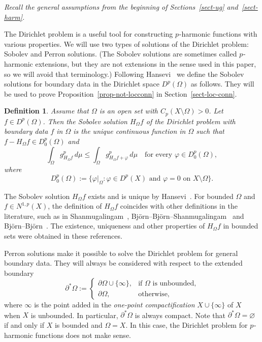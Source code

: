 \documentclass[a4paper,twoside]{article}
\theoremstyle{propositional}
\theoremstyle{descriptive}
\newtheorem{deff}[thm]{Definition}
\theoremstyle{remarkstyle}
\newcommand{\setm}{\setminus}
\renewcommand{\emptyset}{\varnothing}
\newcommand{\Cp}{{C_p}}
\newcommand{\bdry}{\partial}
\newcommand{\bdy}{\bdry}
\newcommand{\Om}{\Omega}
\renewcommand{\phi}{\varphi}
\newcommand{\p}{{$p\mspace{1mu}$}}
\newcommand{\Np}{N^{1,p}}
\newcommand{\Dp}{D^{p}}
\newcommand{\bdystar}{\partial^*}
\newcommand{\binfty}{{\boldsymbol{\infty}}}
\numberwithin{equation}{section}
\begin{document}
\emph{Recall the general assumptions from the beginning of Sections~\ref{sect-ug}
and~\ref{sect-harm}.}

\medskip


The Dirichlet problem is  
a useful tool for constructing \p-harmonic functions
with various properties.
We will use two types of solutions of 
the Dirichlet problem:
Sobolev and Perron solutions.
(The Sobolev solutions are 
sometimes called \p-harmonic extensions,
but they are not extensions in the sense used in this paper,
so we will avoid that terminology.) 
Following Hansevi~\cite[Definition~4.6]{Hansevi1}
we define the Sobolev solutions for boundary data in the
Dirichlet space $\Dp(\Om)$  as follows.
They will be used  to prove Proposition~\ref{prop-not-locconn}
in Section~\ref{sect-loc-conn}. 


\begin{deff}  \label{def-harm-ext}
Assume that $\Om$ is an open set with $\Cp(X \setm \Om)>0$.
Let $f \in \Dp(\Om)$.
Then the \emph{Sobolev solution}
$H_\Om f$ of the Dirichlet problem with boundary data
$f$ in $\Om$ is the unique continuous function
in $\Om$ such that $f-H_\Om f \in \Dp_0(\Om)$ and
\[
     \int_\Om g_{H_\Om f}^p \,d\mu 
    \le \int_\Om g_{H_\Om f+\phi}^p \,d\mu \quad
\text{for every } \phi \in \Dp_0(\Om),
\]
where
\[
\Dp_0(\Om):=
  \{\phi|_{\Om} : \phi \in \Dp(X) \text{ and }
        \phi=0 \text{ on } X \setm \Om\}.
\]
\end{deff}


The Sobolev solution $H_\Om f$ exists  
and is unique by Hansevi~\cite[Theorem~4.4]{Hansevi1}.
For bounded $\Om$ and $f \in \Np(X)$,
the definition
of $H_\Om f$ coincides with other definitions in the literature, such
as in Shan\-mu\-ga\-lin\-gam~\cite[Theorem~5.6]{Sh-harm},
Bj\"orn--Bj\"orn--Shan\-mu\-ga\-lin\-gam~\cite[Definition~3.3]{BBS}
and Bj\"orn--Bj\"orn~\cite[Definition~8.31]{BBbook}.
The existence, uniqueness and other properties of $H_\Om f$ in bounded
sets were obtained in these references.

Perron solutions make it possible to solve the Dirichlet problem
for general boundary data.
They 
will always be considered with respect to the
extended boundary 
\[
\bdystar \Om:= \begin{cases}   
     \bdy\Om \cup \{\binfty\},   &  \text{if $\Om$ is unbounded,}  \\ 
     \bdy \Om,  & \text{otherwise,}  
\end{cases}
\]
where $\binfty$ is the point added in the \emph{one-point compactification} 
$X \cup \{\binfty\}$ of $X$ when $X$ is unbounded.
In particular, $\bdystar \Om$ is always compact.
Note that $\bdystar \Om=\emptyset$ if and only if $X$ is bounded and $\Om=X$.
In this case, the Dirichlet problem for \p-harmonic functions
does not make sense.
\end{document}
